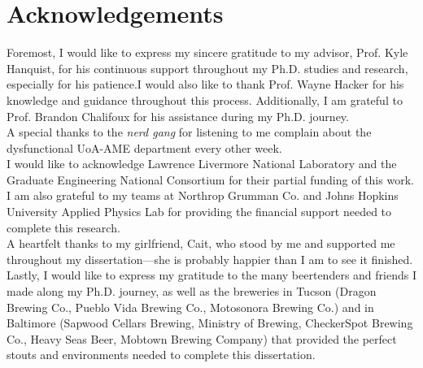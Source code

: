 \chapter*{Acknowledgements}
Foremost, I would like to express my sincere gratitude to my advisor, Prof.
Kyle Hanquist, for his continuous support throughout my Ph.D. studies and
research, especially for his patience.I would also like to thank Prof. Wayne Hacker for his knowledge and guidance throughout this process. Additionally, I am grateful to Prof. Brandon Chalifoux for his assistance during my Ph.D. journey. \\ 

A special thanks to the \textit{nerd gang} for listening to me complain about
the dysfunctional UoA-AME department every other week. \\ 

I would like to acknowledge Lawrence Livermore National Laboratory and the
Graduate Engineering National Consortium for their partial funding of this
work. I am also grateful to my teams at Northrop Grumman Co. and Johns Hopkins
University Applied Physics Lab for providing the financial support needed to
complete this research. \\ 

A heartfelt thanks to my girlfriend, Cait, who stood by me and supported me
throughout my dissertation—she is probably happier than I am to see it
finished. \\ 

Lastly, I would like to express my gratitude to the many beertenders and
friends I made along my Ph.D. journey, as well as the breweries in Tucson
(Dragon Brewing Co., Pueblo Vida Brewing Co., Motosonora Brewing Co.) and in
Baltimore (Sapwood Cellars Brewing, Ministry of Brewing, CheckerSpot Brewing
Co., Heavy Seas Beer, Mobtown Brewing Company) that provided the perfect stouts
and environments needed to complete this dissertation. 
